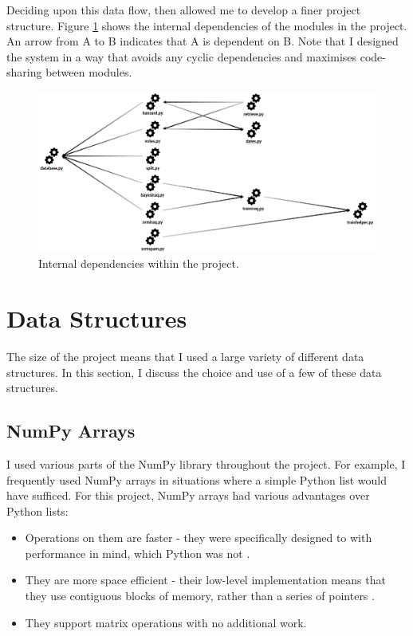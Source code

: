 \documentclass[12pt,a4paper,twoside,openright]{report}
\begin{document}
Deciding upon this data flow, then allowed me to develop a finer project structure. Figure \ref{fig:dependencies} shows the internal dependencies of the modules in the project. An arrow from A to B indicates that A is dependent on B. Note that I designed the system in a way that avoids any cyclic dependencies and maximises code-sharing between modules.

\begin{figure}
	\includegraphics[width=\linewidth]{figs/internaldependencies.png}
	\caption{Internal dependencies within the project.}
	\label{fig:dependencies}
\end{figure}

\section{Data Structures} \label{impl-structures}

The size of the project means that I used a large variety of different data structures. In this section, I discuss the choice and use of a few of these data structures.

\subsection{NumPy Arrays}

I used various parts of the NumPy library throughout the project. For example, I frequently used NumPy arrays in situations where a simple Python list would have sufficed. For this project, NumPy arrays had various advantages over Python lists:
\begin{itemize}
	\item Operations on them are faster - they were specifically designed to with performance in mind, which Python was not \cite{numpyspeed}.
	\item They are more space efficient - their low-level implementation means that they use contiguous blocks of memory, rather than a series of pointers \cite{numpymanual}.
	\item They support matrix operations with no additional work.
\end{itemize}
\end{document}
